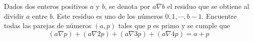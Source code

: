 Dados dos enteros positivos $a$ y $b$, se denota por $a \nabla b$ el residuo que se obtiene al dividir $a$ entre $b$. Este residuo es uno de los números $0,1,\cdots , b-1$. Encuentre todas las parejas de números $(a,p)$ tales que $p$ es primo y se cumple que
\[ (a \nabla p) + (a \nabla 2p) + (a \nabla 3p) + (a \nabla 4p) = a + p \]
